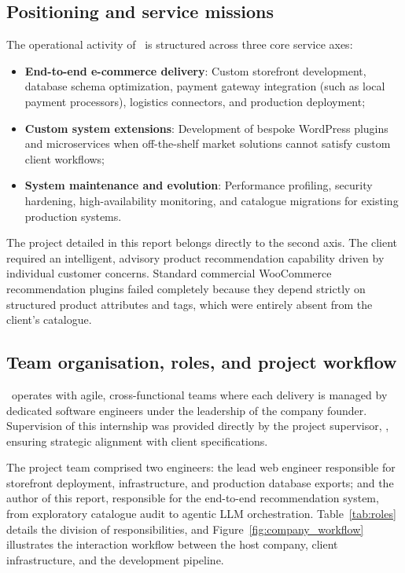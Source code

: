 \subsection{Positioning and service missions}

The operational activity of \companyname\ is structured across three core service axes:
\begin{itemize}
  \item \textbf{End-to-end e-commerce delivery}: Custom storefront development, database schema optimization, payment gateway integration (such as local payment processors), logistics connectors, and production deployment;
  \item \textbf{Custom system extensions}: Development of bespoke WordPress plugins and microservices when off-the-shelf market solutions cannot satisfy custom client workflows;
  \item \textbf{System maintenance and evolution}: Performance profiling, security hardening, high-availability monitoring, and catalogue migrations for existing production systems.
\end{itemize}

The project detailed in this report belongs directly to the second axis. The client required an intelligent, advisory product recommendation capability driven by individual customer concerns. Standard commercial WooCommerce recommendation plugins failed completely because they depend strictly on structured product attributes and tags, which were entirely absent from the client's catalogue.

\subsection{Team organisation, roles, and project workflow}

\companyname\ operates with agile, cross-functional teams where each delivery is managed by dedicated software engineers under the leadership of the company founder. Supervision of this internship was provided directly by the project supervisor, \supervisor, ensuring strategic alignment with client specifications.

The project team comprised two engineers: the lead web engineer responsible for storefront deployment, infrastructure, and production database exports; and the author of this report, responsible for the end-to-end recommendation system, from exploratory catalogue audit to agentic LLM orchestration. Table~\ref{tab:roles} details the division of responsibilities, and Figure~\ref{fig:company_workflow} illustrates the interaction workflow between the host company, client infrastructure, and the development pipeline.

